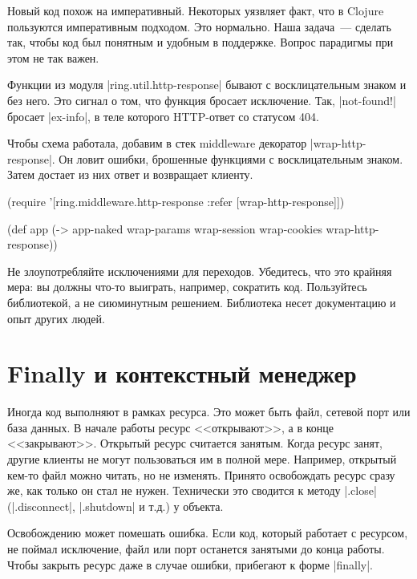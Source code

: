 Новый код похож на императивный. Некоторых уязвляет факт, что в Clojure
пользуются императивным подходом. Это нормально. Наша задача~--- сделать так,
чтобы код был понятным и удобным в поддержке. Вопрос парадигмы при этом не так
важен.

Функции из модуля \spverb|ring.util.http-response| бывают с восклицательным
знаком и без него. Это сигнал о том, что функция бросает исключение. Так,
\spverb|not-found!| бросает \spverb|ex-info|, в теле которого HTTP-ответ со
статусом 404.

Чтобы схема работала, добавим в стек middleware декоратор
\spverb|wrap-http-response|. Он ловит ошибки, брошенные функциями с
восклицательным знаком. Затем достает из них ответ и возвращает клиенту.

\begin{english}
  \begin{clojure}
(require '[ring.middleware.http-response
           :refer [wrap-http-response]])

(def app
  (-> app-naked
      wrap-params
      wrap-session
      wrap-cookies
      wrap-http-response))
  \end{clojure}
\end{english}

Не злоупотребляйте исключениями для переходов. Убедитесь, что это крайняя мера:
вы должны что-то выиграть, например, сократить код. Пользуйтесь библиотекой, а
не сиюминутным решением. Библиотека несет документацию и опыт других людей.

\section{Finally и контекстный менеджер}

Иногда код выполняют в рамках ресурса. Это может быть файл, сетевой порт или
база данных. В начале работы ресурс <<открывают>>, а в конце
<<закрывают>>. Открытый ресурс считается занятым. Когда ресурс занят, другие
клиенты не могут пользоваться им в полной мере. Например, открытый кем-то файл
можно читать, но не изменять. Принято освобождать ресурс сразу же, как только он
стал не нужен. Технически это сводится к методу \spverb|.close|
(\spverb|.disconnect|, \spverb|.shutdown| и т.д.) у объекта.

Освобождению может помешать ошибка. Если код, который работает с ресурсом, не
поймал исключение, файл или порт останется занятыми до конца работы. Чтобы
закрыть ресурс даже в случае ошибки, прибегают к форме \spverb|finally|.

